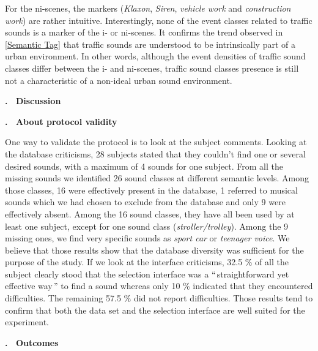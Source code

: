 \documentclass[12pt, titlepage, reqno]{article} %
\renewcommand{\section}[1]{\medskip \addtocounter{section}{1}\raggedright 
     \textbf{\Roman{section}. \ #1}\medskip \setcounter{subsection}{0}
    \setlength{\parindent}{5ex}
 }
\renewcommand{\subsection}[1]{\medskip \addtocounter{subsection}{1}\raggedright
    \textbf{\Alph{subsection}. \ #1} \medskip \setcounter{subsubsection}{0}\setlength{\parindent}{5ex}
}
\begin{document}
For the ni-scenes, the markers  (\textit{Klaxon}, \textit{Siren}, \textit{vehicle work} and \textit{construction work}) are rather intuitive. Interestingly, none of the event classes related to traffic sounds is a marker of the i- or ni-scenes. It confirms the trend observed in \ref{Semantic Tag} that traffic sounds are understood to be intrinsically  part of a urban environment. In other words, although the event densities of traffic sound classes differ between the i- and ni-scenes, traffic sound classes presence is still not a characteristic of a non-ideal urban sound environment.


\section{Discussion}
\subsection{About protocol validity}
One way to validate the protocol is to look at the subject comments. Looking at the database criticisms, 28 subjects stated that they couldn't find one or several desired sounds, with a maximum of 4 sounds for one subject. From all the missing sounds we identified 26 sound classes at different semantic levels. Among those classes, 16 were effectively present in the database, 1 referred to musical sounds which we had chosen to exclude from the database and only 9 were effectively absent. Among the 16 sound classes, they have all been used by at least one subject, except for one sound class (\textit{stroller/trolley}). Among the 9 missing ones, we find very specific sounds as \textit{sport car} or \textit{teenager voice}. We believe that those results show that the database diversity was sufficient for the purpose of the study.
If we look at the interface criticisms, 32.5 \% of all the subject clearly stood that the selection interface was a ``\,straightforward yet effective way\,'' to find a sound whereas  only 10 \% indicated that they encountered difficulties. The remaining 57.5 \%  did not report difficulties.  
Those results tend to confirm that both the data set and the selection interface are well suited for the experiment.

\subsection{Outcomes}
\end{document}
